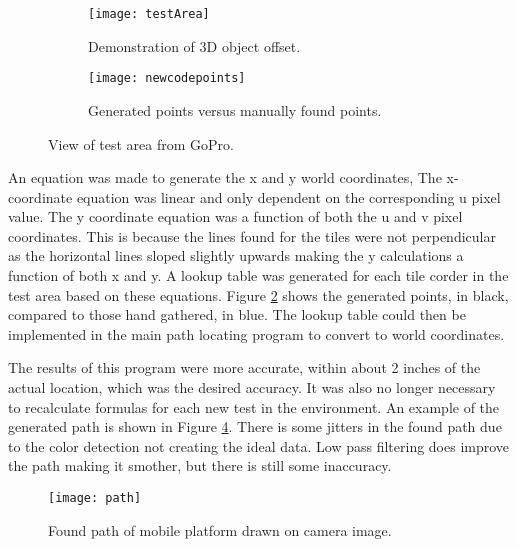 \begin{figure}[h]
    \centering
    \begin{subfigure}[b]{0.45\textwidth}
    	\texttt{[image: testArea]}
    	\caption{Demonstration of 3D object offset. }
    	\label{fig:offset}
   	 \end{subfigure}
   	 \quad
    \begin{subfigure}[b]{0.45\textwidth}
		\texttt{[image: newcodepoints]}
		\caption{Generated points versus manually found points. }
		\label{fig:genpoints}
    \end{subfigure}
    \quad %
 	\caption{View of test area from GoPro.}
 	\label{fig:images}
\end{figure}

An equation was made to generate the x and y world coordinates, The x-coordinate equation was linear and only dependent on the corresponding u pixel value. The y coordinate equation was a function of both the u and v pixel coordinates. This is because the lines found for the tiles were not perpendicular as the horizontal lines sloped slightly upwards making the y calculations a function of both x and y. A lookup table was generated for each tile corder in the test area based on these equations. Figure \ref{fig:genpoints} shows the generated points, in black, compared to those hand gathered, in blue. The lookup table could then be implemented in the main path locating program to convert to world coordinates. 

The results of this program were more accurate, within about 2 inches of the actual location, which was the desired accuracy. It was also no longer necessary to recalculate formulas for each new test in the environment. An example of the generated path is shown in Figure \ref{fig:path}. There is some jitters in the found path due to the color detection not creating the ideal data. Low pass filtering does improve the path making it smother, but there is still some inaccuracy. 

\begin{figure}
\centering
\texttt{[image: path]}
\caption{Found path of mobile platform drawn on camera image.}
\label{fig:path}
\end{figure}